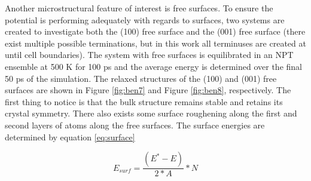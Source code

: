 \documentclass[review]{elsarticle}
\begin{document}

\FloatBarrier

Another microstructural feature of interest is free surfaces.  To ensure the potential is performing adequately with regards to surfaces, two systems are created to investigate both the (100) free surface and the (001) free surface (there exist multiple possible terminations, but in this work all terminuses are created at until cell boundaries).  The system with free surfaces is equilibrated in an NPT ensemble at 500 K for 100 ps and the average energy is determined over the final 50 ps of the simulation.  The relaxed structures of the (100) and (001) free surfaces are shown in Figure \ref{fig:ben7} and Figure \ref{fig:ben8}, respectively.  The first thing to notice is that the bulk structure remains stable and retains its crystal symmetry.  There also exists some surface roughening along the first and second layers of atoms along the free surfaces.  The surface energies are determined by equation \ref{eq:surface}

\begin{equation}
\label{eq:surface}
E_{surf}= \frac{(E^{*} - E)}{2*A} * N
\end{equation}
\end{document}
